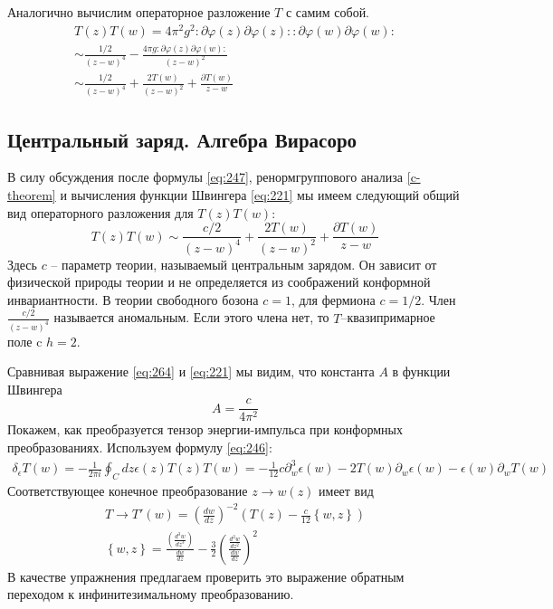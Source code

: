 \documentclass[a4paper,12pt]{article} \usepackage[utf8x]{inputenc} \usepackage[russian]{babel}
\theoremstyle{definition} \newtheorem{corollary}{Corollary}[theorem] \theoremstyle{definition}
\begin{document}
Аналогично вычислим операторное разложение $T$ с самим собой.
\begin{multline}
  \label{eq:263} T(z) T(w) =4 \pi^{2}g^{2}:\partial \varphi(z) \partial \varphi(z): :\partial
\varphi(w)\partial \varphi(w): \\ \sim \frac{1/2}{(z-w)^{4}} -\frac{4\pi g:\partial
\varphi(z) \partial \varphi(w):}{(z-w)^{2}} \\ \sim \frac{1/2}{(z-w)^{4}}+ \frac{2T(w)}{(z-w)^{2}}
+\frac{\partial T(w)}{z-w}
\end{multline}

\subsection{Центральный заряд. Алгебра Вирасоро}
\label{sec:virasoro}

В силу обсуждения после формулы \eqref{eq:247}, ренормгруппового анализа \ref{c-theorem} и
вычисления функции Швингера \eqref{eq:221} мы имеем следующий общий вид операторного разложения для
$T(z)T(w)$:
\begin{equation}
  \label{eq:264} T(z)T(w) \sim \frac{c/2}{(z-w)^{4}}+ \frac{2T(w)}{(z-w)^{2}} +\frac{\partial
T(w)}{z-w}
\end{equation} Здесь $c$ -- параметр теории, называемый центральным зарядом. Он зависит от
физической природы теории и не определяется из соображений конформной инвариантности. В теории
свободного бозона $c=1$, для фермиона $c=1/2$. Член $\frac{c/2}{(z-w)^{4}}$ называется аномальным.
Если этого члена нет, то $T$--квазипримарное поле c $h=2$.

Сравнивая выражение \eqref{eq:264} и \eqref{eq:221} мы видим, что константа $A$ в функции Швингера
\begin{equation}
  \label{eq:265} A=\frac{c}{4\pi^{2}}
\end{equation} Покажем, как преобразуется тензор энергии-импульса при конформных преобразованиях.
Используем формулу \eqref{eq:246}:
\begin{multline}
  \label{eq:266} \delta_{\epsilon} T(w) =-\frac{1}{2\pi i} \oint_{C} dz \epsilon(z) T(z) T(w)
=-\frac{1}{12} c \partial_{w}^{3}\epsilon(w) -2 T(w) \partial_{w} \epsilon(w)
-\epsilon(w) \partial_{w}T(w)
\end{multline} Соответствующее конечное преобразование $z\to w(z)$ имеет вид
\begin{eqnarray}
  \label{eq:267} T\to T'(w) =\left(\frac{dw}{dz}\right)^{-2} \left(T(z) -\frac{c}{12} \left\{
w,z\right\}\right)\\ \left\{ w,z\right\}=\frac{\left(\frac{d^{3}w}{dz^{3}}\right) } {\frac{dw}{dz}}
-\frac{3}{2}\left(\frac{\frac{d^{2}w}{dz^{2}}}{\frac{dw}{dz}}\right)^{2}
\end{eqnarray} В качестве упражнения предлагаем проверить это выражение обратным переходом к
инфинитезимальному преобразованию.
\end{document}
